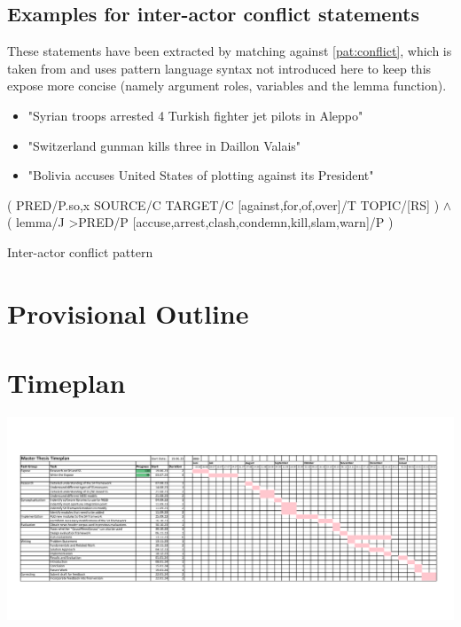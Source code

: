\documentclass[11pt]{scrreprt}
\let\citef\cite  %
\let\cite\parencite  %
\begin{document}
\subsection{Examples for inter-actor conflict statements}
These statements have been extracted by matching against \cref{pat:conflict}, which is taken from \citef{menezesSemanticHypergraphs2021} and uses pattern language syntax not introduced here to keep this expose more concise (namely argument roles, variables and the lemma function).

\label{sec:conflict-examples}
\begin{itemize}
	\item "Syrian troops arrested 4 Turkish fighter jet pilots in Aleppo"
	\item "Switzerland gunman kills three in Daillon Valais"
	\item "Bolivia accuses United States of plotting against its President"
\end{itemize}


\begin{pattern}
  \normalfont\sffamily
  \centering
  ( PRED/P.{so,x} SOURCE/C TARGET/C [against,for,of,over]/T TOPIC/[RS] ) \(\wedge\)\\ ( lemma/J >PRED/P [accuse,arrest,clash,condemn,kill,slam,warn]/P )
  \caption{Inter-actor conflict pattern}
  \label{pat:conflict}
\end{pattern}


\section{Provisional Outline}

\makeatletter

\makeatother


\newpage
\section{Timeplan}
\begin{center}
\includegraphics[page=1, angle=90]{Timeplan.pdf}	
\end{center}


\printbibliography[title={References}]
\end{document}
